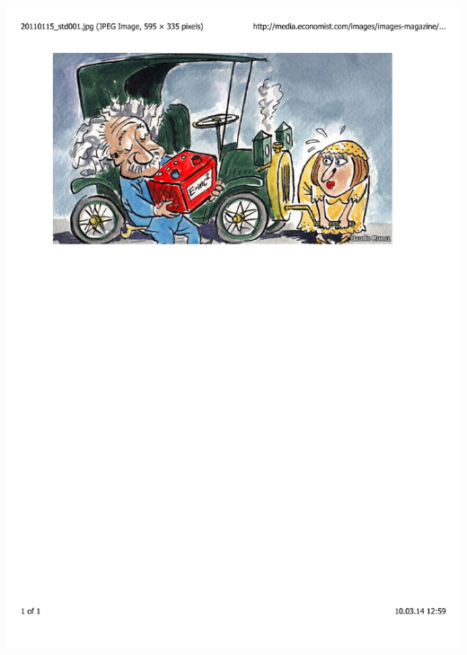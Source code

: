 \documentclass[mathserif,8pt]{beamer}
\begin{document}
\begin{frame}
\begin{columns}
\begin{column}{.40\textwidth}
	\includegraphics[viewport = 60 530 510 790, clip, scale=0.3]{figures/economist.pdf}\\
	\ \\

\end{column}
\end{columns}
\end{frame}
\end{document}

